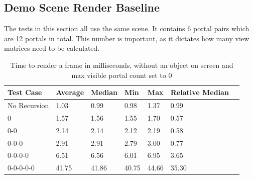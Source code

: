 \subsection{Demo Scene Render Baseline}
The tests in this section all use the same scene. It contains 6 portal pairs which are 12 portals in total. This number is important, as it dictates how many view matrices need to be calculated.


\begin{table}[H]
	\centering
	\begin{tabular}{|l|l|l|l|l|l|l|}
		\hline
		Test Case    & Average & Median & Min   & Max   & Relative Median \\ \hline
		No Recursion & 1.03    & 0.99   & 0.98  & 1.37  & 0.99            \\ \hline
		0            & 1.57    & 1.56   & 1.55  & 1.70  & 0.57            \\ \hline
		0-0          & 2.14    & 2.14   & 2.12  & 2.19  & 0.58            \\ \hline
		0-0-0        & 2.91    & 2.91   & 2.79  & 3.00  & 0.77            \\ \hline
		0-0-0-0      & 6.51    & 6.56   & 6.01  & 6.95  & 3.65            \\ \hline
		0-0-0-0-0    & 41.75   & 41.86  & 40.75 & 44.66 & 35.30           \\ \hline        
	\end{tabular}
	\caption{Time to render a frame in milliseconds, without an object on screen and max visible portal count set to 0}
	\label{tab:baseline}
\end{table}

